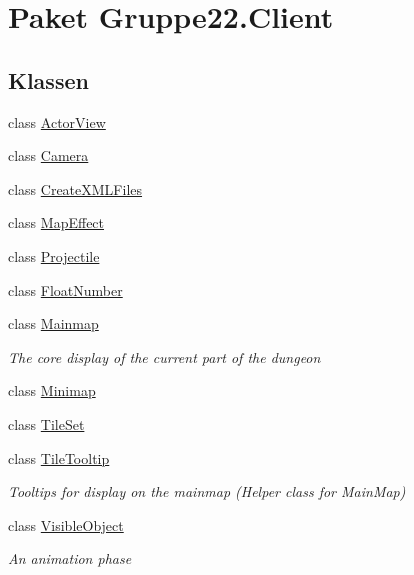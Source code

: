 \hypertarget{namespace_gruppe22_1_1_client}{\section{Paket Gruppe22.\-Client}
\label{namespace_gruppe22_1_1_client}
}
\subsection*{Klassen}
\begin{DoxyCompactItemize}
\item 
class \hyperlink{class_gruppe22_1_1_client_1_1_actor_view}{Actor\-View}
\item 
class \hyperlink{class_gruppe22_1_1_client_1_1_camera}{Camera}
\item 
class \hyperlink{class_gruppe22_1_1_client_1_1_create_x_m_l_files}{Create\-X\-M\-L\-Files}
\item 
class \hyperlink{class_gruppe22_1_1_client_1_1_map_effect}{Map\-Effect}
\item 
class \hyperlink{class_gruppe22_1_1_client_1_1_projectile}{Projectile}
\item 
class \hyperlink{class_gruppe22_1_1_client_1_1_float_number}{Float\-Number}
\item 
class \hyperlink{class_gruppe22_1_1_client_1_1_mainmap}{Mainmap}
\begin{DoxyCompactList}\small\item\em The core display of the current part of the dungeon \end{DoxyCompactList}\item 
class \hyperlink{class_gruppe22_1_1_client_1_1_minimap}{Minimap}
\item 
class \hyperlink{class_gruppe22_1_1_client_1_1_tile_set}{Tile\-Set}
\item 
class \hyperlink{class_gruppe22_1_1_client_1_1_tile_tooltip}{Tile\-Tooltip}
\begin{DoxyCompactList}\small\item\em Tooltips for display on the mainmap (Helper class for Main\-Map) \end{DoxyCompactList}\item 
class \hyperlink{class_gruppe22_1_1_client_1_1_visible_object}{Visible\-Object}
\begin{DoxyCompactList}\small\item\em An animation phase \end{DoxyCompactList}\item 

\end{DoxyCompactItemize}
